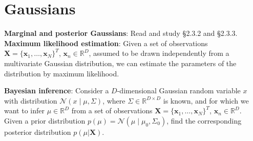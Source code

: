 \documentclass[11pt,noanswers,addpoints]{exam}
\newcommand{\R}{\mathbb R}
\newcommand{\X}{\mathbf X}
\newcommand{\x}{\mathbf x}
\newcommand{\N}{\mathcal N}
\begin{document}
\section{Gaussians}
\begin{questions}
\question \textbf{Marginal and posterior Gaussians}: Read and study \S2.3.2 and \S2.3.3.
\question \textbf{Maximum likelihood estimation}: Given a set of observations $\X = \{\x_1,\ldots,\x_N\}^T$, $\x_n\in\R^D$, assumed to be drawn independently from a multivariate Gaussian distribution, we can estimate the parameters of the distribution by maximum likelihood.
\question \textbf{Bayesian inference}: Consider a $D$-dimensional Gaussian random variable $x$ with distribution $\N(x\mid \mu,\Sigma)$, where $\Sigma\in\R^{D\times D}$ is known, and for which we want to infer $\mu\in\R^D$ from a set of observations $\X = \{\x_1,\ldots,\x_N\}^T$, $\x_n\in\R^D$. Given a prior distribution $p(\mu)=\N(\mu\mid\mu_0,\Sigma_0)$, find the corresponding posterior distribution $p(\mu|\X)$.
\end{questions}
\end{document}
